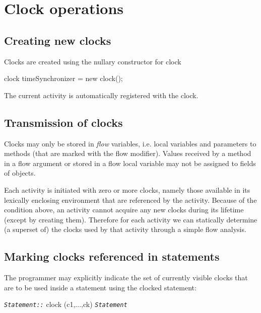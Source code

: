 \section{Clock operations}
\subsection{Creating new clocks}

Clocks are created using the nullary constructor for {\cf clock}

\begin{x10}
clock timeSynchronizer = new clock();
\end{x10}

The current activity is automatically registered with the clock.

\subsection{Transmission of clocks}
Clocks may only be stored in {\em flow} variables, i.e.{} local variables and parameters to methods (that are
marked with the {\cf flow} modifier).  Values received by a method in
a {\cf flow} argument or stored in a {\cf flow} local variable may not
be assigned to fields of objects.


Each activity is initiated with zero or more clocks, namely those
available in its lexically enclosing environment that are referenced
by the activity.  Because of the condition above, an activity cannot
acquire any new clocks during its lifetime (except by creating
them). Therefore for each activity we can statically determine (a
superset of) the clocks used by that activity through a simple flow
analysis.


\subsection{Marking clocks referenced in statements}
The programmer may explicitly indicate the set of currently visible
clocks that are to be used inside a statement using the
clocked statement:
\begin{x10}
  {\tt\em{}Statement::}
     clock (c1,...,ck) {\tt\em{}Statement}
\end{x10}

